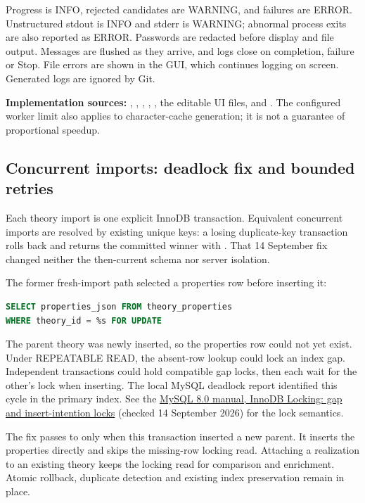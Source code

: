 Progress is INFO, rejected candidates are WARNING, and failures are ERROR.
Unstructured stdout is INFO and stderr is WARNING; abnormal process exits are
also reported as ERROR. Passwords are redacted before display and file output.
Messages are flushed as they arrive, and logs close on completion, failure or
Stop. File errors are shown in the GUI, which continues logging on screen.
Generated logs are ignored by Git.

\textbf{Implementation sources:} ,
, ,
, , the editable UI
files, and . The configured worker limit also applies to
character-cache generation; it is not a guarantee of proportional speedup.

\clearpage
\subsection{Concurrent imports: deadlock fix and bounded retries}
Each theory import is one explicit InnoDB transaction. Equivalent concurrent
imports are resolved by existing unique keys: a losing duplicate-key transaction
rolls back and returns the committed winner with .
That 14 September fix changed neither the then-current schema nor server isolation.

The former fresh-import path selected a properties row before inserting it:
\begin{lstlisting}[language=SQL]
SELECT properties_json FROM theory_properties
WHERE theory_id = %s FOR UPDATE
\end{lstlisting}
The parent theory was newly inserted, so the properties row could not yet
exist. Under REPEATABLE READ, the absent-row lookup could lock an index gap.
Independent transactions could hold compatible gap locks, then each wait for
the other's lock when inserting. The local MySQL deadlock report identified
this cycle in the  primary index. See the
\href{https://dev.mysql.com/doc/refman/8.0/en/innodb-locking.html}{MySQL 8.0
manual, InnoDB Locking: gap and insert-intention locks} (checked 14 September
2026) for the lock semantics.

The fix passes  to  only
when this transaction inserted a new parent. It inserts the properties directly
and skips the missing-row locking read. Attaching a realization to an existing
theory keeps the locking read for comparison and enrichment. Atomic rollback,
duplicate detection and existing index preservation remain in place.

